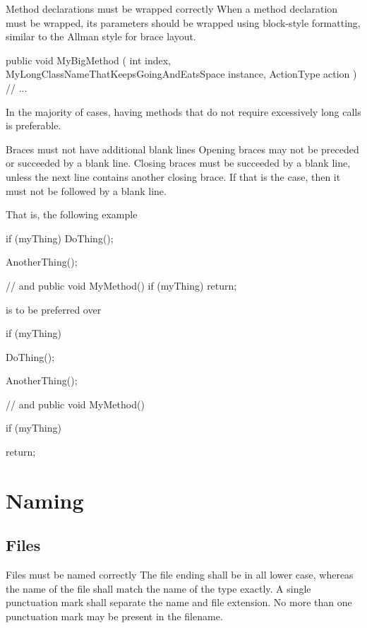\documentclass[11pt,a4paper]{article}
\begin{document}
\begin{must}{Method declarations must be wrapped correctly}
When a method declaration must be wrapped, its parameters should be wrapped using block-style formatting, similar to the Allman style for brace layout.
\end{must}

\begin{code}
public void MyBigMethod
(
    int index,
    MyLongClassNameThatKeepsGoingAndEatsSpace instance,
    ActionType action
)
{
    // ...
}
\end{code}

In the majority of cases, having methods that do not require excessively long calls is preferable.

\begin{must}{Braces must not have additional blank lines}
Opening braces may not be preceded or succeeded by a blank line.
Closing braces must be succeeded by a blank line, unless the next line contains another closing brace. If that is the case, then it must not be followed by a blank line.
\end{must}

That is, the following example 
\begin{code}
if (myThing)
{
	DoThing();
}

AnotherThing();

// and
public void MyMethod()
{
	if (myThing)
	{
		return;
	}
}
\end{code}

is to be preferred over

\begin{code}
if (myThing)
{

	DoThing();
}

AnotherThing();

// and
public void MyMethod()
{
	if (myThing)
	{
	
		return;
		
	}
	
}
\end{code}

\section{Naming}
\subsection{Files}
\begin{must}{Files must be named correctly}
The file ending shall be in all lower case, whereas the name of the file shall match the name of the type exactly. A single punctuation mark shall separate the name and file extension. No more than one punctuation mark may be present in the filename.
\end{must}
\end{document}
